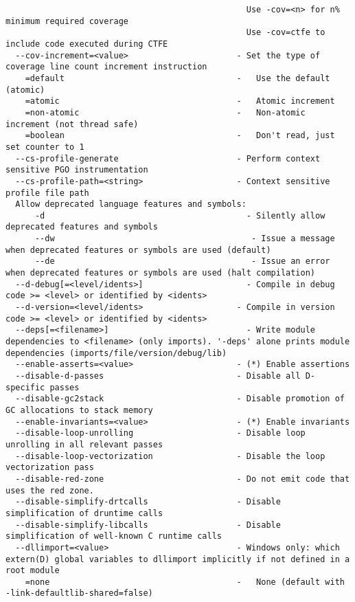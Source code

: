 \documentclass{studrep}
\begin{document}
\begin{verbatim}
                                                 Use -cov=<n> for n% minimum required coverage
                                                 Use -cov=ctfe to include code executed during CTFE
  --cov-increment=<value>                      - Set the type of coverage line count increment instruction
    =default                                   -   Use the default (atomic)
    =atomic                                    -   Atomic increment
    =non-atomic                                -   Non-atomic increment (not thread safe)
    =boolean                                   -   Don't read, just set counter to 1
  --cs-profile-generate                        - Perform context sensitive PGO instrumentation
  --cs-profile-path=<string>                   - Context sensitive profile file path
  Allow deprecated language features and symbols:
      -d                                         - Silently allow deprecated features and symbols
      --dw                                        - Issue a message when deprecated features or symbols are used (default)
      --de                                        - Issue an error when deprecated features or symbols are used (halt compilation)
  --d-debug[=<level/idents>]                     - Compile in debug code >= <level> or identified by <idents>
  --d-version=<level/idents>                   - Compile in version code >= <level> or identified by <idents>
  --deps[=<filename>]                            - Write module dependencies to <filename> (only imports). '-deps' alone prints module dependencies (imports/file/version/debug/lib)
  --enable-asserts=<value>                     - (*) Enable assertions
  --disable-d-passes                           - Disable all D-specific passes
  --disable-gc2stack                           - Disable promotion of GC allocations to stack memory
  --enable-invariants=<value>                  - (*) Enable invariants
  --disable-loop-unrolling                     - Disable loop unrolling in all relevant passes
  --disable-loop-vectorization                 - Disable the loop vectorization pass
  --disable-red-zone                           - Do not emit code that uses the red zone.
  --disable-simplify-drtcalls                  - Disable simplification of druntime calls
  --disable-simplify-libcalls                  - Disable simplification of well-known C runtime calls
  --dllimport=<value>                          - Windows only: which extern(D) global variables to dllimport implicitly if not defined in a root module
    =none                                      -   None (default with -link-defaultlib-shared=false)

\end{verbatim}
\end{document}
